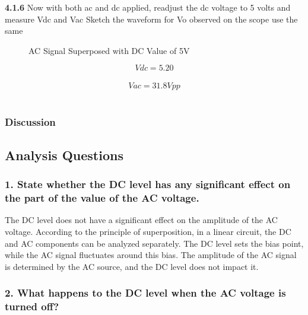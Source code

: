 \textbf{4.1.6} Now with both ac and dc applied, readjust the dc voltage to 5 volts and measure Vdc and Vac Sketch the waveform for Vo observed on the scope use the same

\begin{figure}[H]
    \centering
    \caption{AC Signal Superposed with DC Value of 5V}
\end{figure}
$$Vdc=5.20$$ \\
$$Vac=31.8Vpp$$ \\
\subsubsection{Discussion}
\subsection{Analysis Questions}

\subsubsection{1. State whether the DC level has any significant effect on the part of the value of the AC voltage.}

The DC level does not have a significant effect on the amplitude of the AC voltage. According to the principle of superposition, in a linear circuit, the DC and AC components can be analyzed separately. The DC level sets the bias point, while the AC signal fluctuates around this bias. The amplitude of the AC signal is determined by the AC source, and the DC level does not impact it.

\subsubsection{2. What happens to the DC level when the AC voltage is turned off?}

